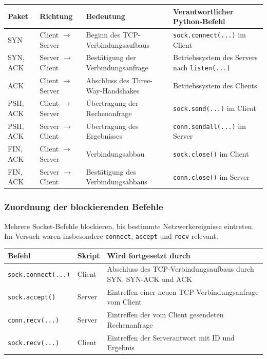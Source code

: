 \documentclass{kdiartcl}
\begin{document}
\begin{center}
\small
\begin{tabularx}{\textwidth}{|l|l|Y|Y|}
\hline
\textbf{Paket} & \textbf{Richtung} & \textbf{Bedeutung} & \textbf{Verantwortlicher Python-Befehl} \\
\hline
SYN & Client $\rightarrow$ Server &
Beginn des TCP-Verbindungsaufbaus &
\texttt{sock.connect(...)} im Client \\
\hline
SYN, ACK & Server $\rightarrow$ Client &
Bestätigung der Verbindungsanfrage &
Betriebssystem des Servers nach \texttt{listen(...)} \\
\hline
ACK & Client $\rightarrow$ Server &
Abschluss des Three-Way-Handshakes &
Betriebssystem des Clients \\
\hline
PSH, ACK & Client $\rightarrow$ Server &
Übertragung der Rechenanfrage &
\texttt{sock.send(...)} im Client \\
\hline
PSH, ACK & Server $\rightarrow$ Client &
Übertragung des Ergebnisses &
\texttt{conn.sendall(...)} im Server \\
\hline
FIN, ACK & Client $\rightarrow$ Server &
Verbindungsabbau &
\texttt{sock.close()} im Client \\
\hline
FIN, ACK & Server $\rightarrow$ Client &
Bestätigung des Verbindungsabbaus &
\texttt{conn.close()} im Server \\
\hline
\end{tabularx}
\end{center}

\subsubsection{Zuordnung der blockierenden Befehle}

Mehrere Socket-Befehle blockieren, bis bestimmte Netzwerkereignisse eintreten.
Im Versuch waren insbesondere \texttt{connect}, \texttt{accept} und \texttt{recv}
relevant.

\begin{center}
\small
\begin{tabularx}{\textwidth}{|l|l|Y|}
\hline
\textbf{Befehl} & \textbf{Skript} & \textbf{Wird fortgesetzt durch} \\
\hline
\texttt{sock.connect(...)} & Client &
Abschluss des TCP-Verbindungsaufbaus durch SYN, SYN-ACK und ACK \\
\hline
\texttt{sock.accept()} & Server &
Eintreffen einer neuen TCP-Verbindungsanfrage vom Client \\
\hline
\texttt{conn.recv(...)} & Server &
Eintreffen der vom Client gesendeten Rechenanfrage \\
\hline
\texttt{sock.recv(...)} & Client &
Eintreffen der Serverantwort mit ID und Ergebnis \\
\hline
\end{tabularx}
\end{center}
\end{document}
